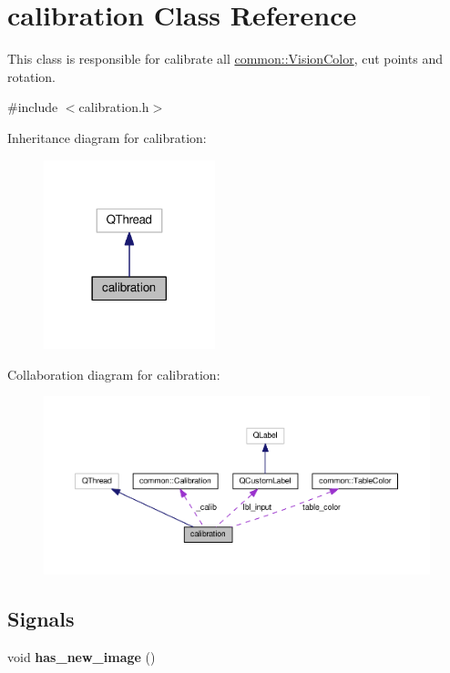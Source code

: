 \hypertarget{classcalibration}{}\section{calibration Class Reference}
\label{classcalibration}


This class is responsible for calibrate all \hyperlink{structcommon_1_1VisionColor}{common\+::\+Vision\+Color}, cut points and rotation.  




{\ttfamily \#include $<$calibration.\+h$>$}



Inheritance diagram for calibration\+:\nopagebreak
\begin{figure}[H]
\begin{center}
\leavevmode
\includegraphics[width=141pt]{classcalibration__inherit__graph}
\end{center}
\end{figure}


Collaboration diagram for calibration\+:\nopagebreak
\begin{figure}[H]
\begin{center}
\leavevmode
\includegraphics[width=350pt]{classcalibration__coll__graph}
\end{center}
\end{figure}
\subsection*{Signals}
\begin{DoxyCompactItemize}
\item 
void {\bfseries has\+\_\+new\+\_\+image} ()\hypertarget{classcalibration_a7e9eab43274288524d9d3c1a9d0f3b87}{}\label{classcalibration_a7e9eab43274288524d9d3c1a9d0f3b87}

\end{DoxyCompactItemize}
